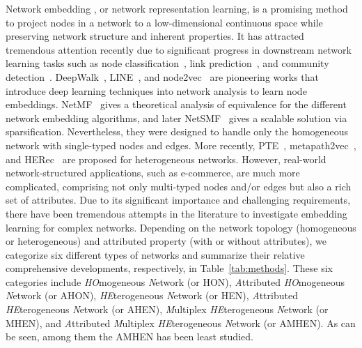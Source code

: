 \documentclass[sigconf]{acmart}
\begin{document}
Network embedding \cite{cui2018survey}, or network representation learning, is a promising method to project nodes in a network to a low-dimensional continuous space while preserving network structure and inherent properties. 
It has attracted tremendous attention recently due to significant progress in downstream network learning tasks such as node classification~\cite{bhagat2011node}, link prediction~\cite{taskar2004link}, and community detection~\cite{fortunato2010community}. 
DeepWalk~\cite{perozzi2014deepwalk}, LINE~\cite{tang2015line}, and node2vec~\cite{grover2016node2vec} are pioneering works that introduce deep learning techniques into network analysis to learn 
node embeddings. NetMF~\cite{qiu2018network}  gives a theoretical analysis of equivalence for the different network embedding algorithms, and later NetSMF~\cite{qiu2019netsmf} gives a scalable solution via sparsification.
Nevertheless, they were designed to handle only the homogeneous network  with single-typed nodes and edges.
More recently, PTE~\cite{tang2015pte}, metapath2vec~\cite{dong2017metapath2vec}, and HERec~\cite{shi2018heterogeneous} are proposed  for heterogeneous networks.
However, real-world  network-structured applications, such as e-commerce, are much more complicated, comprising not only multi-typed nodes and/or edges but also a rich set of  attributes.
Due to its significant importance and challenging requirements, 
there have been tremendous attempts in the literature to investigate embedding learning for  complex networks. Depending on the network topology (homogeneous or heterogeneous) and attributed property (with or without attributes), we categorize six different types of networks and summarize their relative comprehensive developments, respectively, in Table~\ref{tab:methods}. These six categories include \textit{HO}mogeneous \textit{N}etwork (or HON),  \textit{A}ttributed \textit{HO}mogeneous \textit{N}etwork (or AHON),  \textit{HE}terogeneous \textit{N}etwork (or HEN), \textit{A}ttributed \textit{HE}terogeneous \textit{N}etwork (or AHEN), \textit{M}ultiplex \textit{HE}terogeneous \textit{N}etwork (or MHEN), and \textit{A}ttributed \textit{M}ultiplex \textit{HE}terogeneous \textit{N}etwork (or AMHEN).  
As can be seen, among them the AMHEN has been least studied.
 
\end{document}
